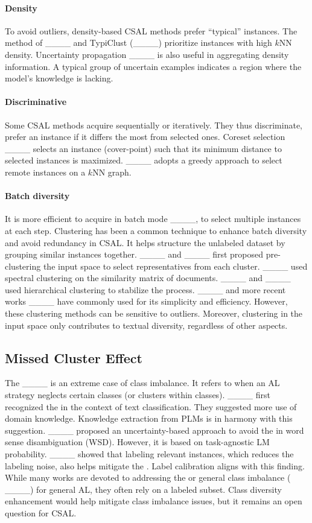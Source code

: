 \paragraph{Density}
To avoid outliers, density-based CSAL methods prefer ``typical'' instances.
The method of ____ and TypiClust (____) prioritize instances with high $k$NN density.
Uncertainty propagation ____ is also useful in aggregating density information.
A typical group of uncertain examples indicates a region where the model's knowledge is lacking.

\paragraph{Discriminative}
Some CSAL methods acquire sequentially or iteratively.
They thus discriminate, \ie{} prefer an instance if it differs the most from selected ones.
Coreset selection ____ selects an instance (cover-point) such that its minimum distance to selected instances is maximized.
\votek{} ____ adopts a greedy approach to select remote instances on a $k$NN graph.

\paragraph{Batch diversity}
It is more efficient to acquire in batch mode ____, \ie{} to select multiple instances at each step.
Clustering has been a common technique to enhance batch diversity and avoid redundancy in CSAL.
It helps structure the unlabeled dataset by grouping similar instances together.
____ and ____ first proposed \mbox{pre-clustering} the input space to select representatives from each cluster. %
____ used spectral clustering on the similarity matrix of documents.
____ and ____ used hierarchical clustering to stabilize the process.
____ and more recent works ____ have commonly used \kmeans{} for its simplicity and efficiency.
However, these clustering methods can be sensitive to outliers.
Moreover, clustering in the input space only contributes to textual diversity, regardless of other aspects.%

\subsection{Missed Cluster Effect}
The \mse{} ____ is an extreme case of class imbalance.
It refers to when an AL strategy neglects certain classes (or clusters within classes).
____ first recognized the \mse{} in the context of text classification.
They suggested more use of domain knowledge. %
Knowledge extraction from PLMs is in harmony with this suggestion.
____ proposed an uncertainty-based approach to avoid the \mse{} in word sense disambiguation (WSD). %
However, it is based on task-agnostic LM probability.
____ showed that labeling relevant instances, which reduces the labeling noise, also helps mitigate the \mse{}.
Label calibration aligns with this finding.
While many works are devoted to addressing the \mse{} or general class imbalance (\eg{} ____) for general AL, they often rely on a labeled subset. %
Class diversity enhancement would help mitigate class imbalance issues, but it remains an open question for CSAL.